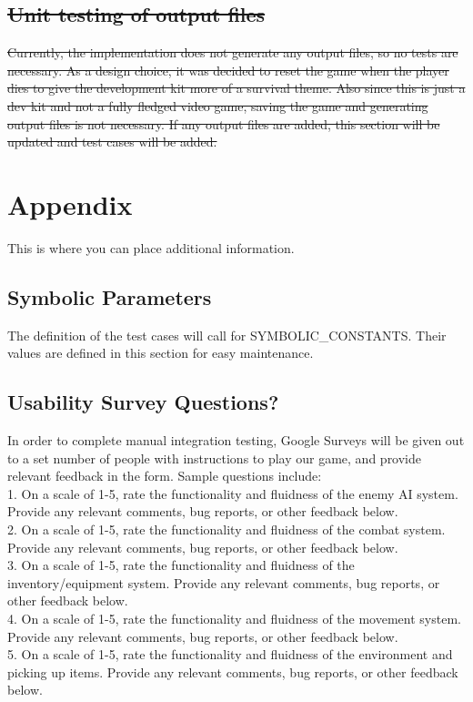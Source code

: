 \documentclass[12pt, titlepage]{article}
\DeclareRobustCommand{\hsout}[1]{\texorpdfstring{\sout{#1}}{#1}}
\begin{document}
\subsection{\hsout{Unit testing of output files}}		

\sout{Currently, the implementation does not generate any output files, so no tests are necessary. As a design choice, it was decided to reset the game when the player dies to give the development kit more of a survival theme. Also since this is just a dev kit and not a fully fledged video game, saving the game and generating output files is not necessary. If any output files are added, this section will be updated and test cases will be added.}



%
%
%
%
%
\section{Appendix}

This is where you can place additional information.

\subsection{Symbolic Parameters}

The definition of the test cases will call for SYMBOLIC\_CONSTANTS.
Their values are defined in this section for easy maintenance.

\subsection{Usability Survey Questions?}

In order to complete manual integration testing, Google Surveys will be given out to a set number of people with instructions to play our game, and provide relevant feedback in the form. Sample questions include: \\

1. On a scale of 1-5, rate the functionality and fluidness of the enemy AI system. Provide any relevant comments, bug reports, or other feedback below.\\

2. On a scale of 1-5, rate the functionality and fluidness of the combat system. Provide any relevant comments, bug reports, or other feedback below.\\

3. On a scale of 1-5, rate the functionality and fluidness of the inventory/equipment system. Provide any relevant comments, bug reports, or other feedback below.\\

4. On a scale of 1-5, rate the functionality and fluidness of the movement system. Provide any relevant comments, bug reports, or other feedback below.\\

5. On a scale of 1-5, rate the functionality and fluidness of the environment and picking up items. Provide any relevant comments, bug reports, or other feedback below.\\
\end{document}
